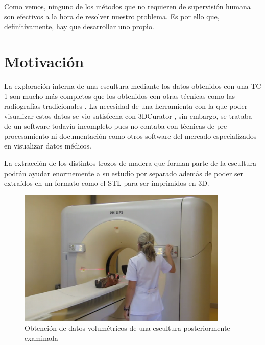 Como vemos, ninguno de los métodos que no requieren de supervisión humana son efectivos a la hora de resolver nuestro problema. Es por ello que, definitivamente, hay que desarrollar uno propio.

\section{Motivación}

La exploración interna de una escultura mediante los datos obtenidos con una TC \ref{fig:introduccion/ct-scan} son mucho más completos que los obtenidos con otras técnicas como las radiografías tradicionales \cite{sarrio16}. La necesidad de una herramienta con la que poder visualizar estos datos se vio satisfecha con 3DCurator \cite{bolivar16}, sin embargo, se trataba de un software todavía incompleto pues no contaba con técnicas de pre-procesamiento ni documentación como otros software del mercado especializados en visualizar datos médicos.

La extracción de los distintos trozos de madera que forman parte de la escultura podrán ayudar enormemente a su estudio por separado además de poder ser extraídos en un formato como el STL para ser imprimidos en 3D.

\begin{figure}[H]
	\centering
	\includegraphics[width=10cm]{imagenes/introduccion/ct-scan}
	\caption{Obtención de datos volumétricos de una escultura posteriormente examinada}
	\label{fig:introduccion/ct-scan}
\end{figure}